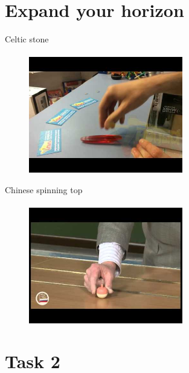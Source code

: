 \documentclass[aspectratio=169]{beamer}
\begin{document}
\section*{Expand your horizon}

\begin{frame}[t]{Celtic stone}
    \framesubtitle{}
        \vspace{-0.6cm}
        \begin{figure}[H]
            \href{https://youtu.be/nsSkmgmFWRU}{\centering\includegraphics[width=0.6\textwidth,keepaspectratio]{image9.jpg}}
            \label{fig:image9}
        \end{figure}
    \end{frame}
    
    \begin{frame}[t]{Chinese spinning top}
        \framesubtitle{}
            \vspace{-0.6cm}
            \begin{figure}[H]
                \href{https://youtu.be/V7hGcLU_wlY}{\centering\includegraphics[width=0.6\textwidth,keepaspectratio]{image8.jpg}}
                \label{fig:image8}
            \end{figure}
        \end{frame}

\section*{Task 2}
\end{document}
